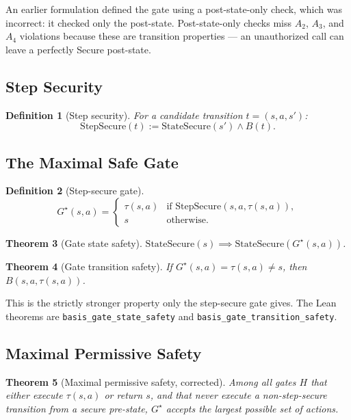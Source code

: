 \documentclass[11pt,a4paper]{article}
\newtheorem{theorem}{Theorem}
\newtheorem{definition}[theorem]{Definition}
\begin{document}
An earlier formulation defined the gate using a post-state-only check, which was incorrect: it checked only the post-state. Post-state-only checks miss $A_2$, $A_3$, and $A_4$ violations because these are transition properties — an unauthorized call can leave a perfectly Secure post-state.

\subsection{Step Security}

\begin{definition}[Step security]\label{def:step-secure}
For a candidate transition $t = (s, a, s')$:
\[
\mathrm{StepSecure}(t) := \mathrm{StateSecure}(s') \wedge B(t).
\]
\end{definition}

\subsection{The Maximal Safe Gate}

\begin{definition}[Step-secure gate]\label{def:gate}
\[
G^\star(s, a) = \begin{cases}
\tau(s, a) & \text{if } \mathrm{StepSecure}(s, a, \tau(s, a)),\\
s & \text{otherwise.}
\end{cases}
\]
\end{definition}

\begin{theorem}[Gate state safety]\label{thm:gate-state-safety}
$\mathrm{StateSecure}(s) \implies \mathrm{StateSecure}(G^\star(s, a))$.
\end{theorem}

\begin{theorem}[Gate transition safety]\label{thm:gate-trans-safety}
If $G^\star(s, a) = \tau(s, a) \neq s$, then $B(s, a, \tau(s, a))$.
\end{theorem}

This is the strictly stronger property only the step-secure gate gives. The Lean theorems are \texttt{basis\_gate\_state\_safety} and \texttt{basis\_gate\_transition\_safety}.

\subsection{Maximal Permissive Safety}

\begin{theorem}[Maximal permissive safety, corrected]\label{thm:max-safe}
Among all gates $H$ that either execute $\tau(s,a)$ or return $s$, and that never execute a non-step-secure transition from a secure pre-state, $G^\star$ accepts the largest possible set of actions.
\end{theorem}
\end{document}
